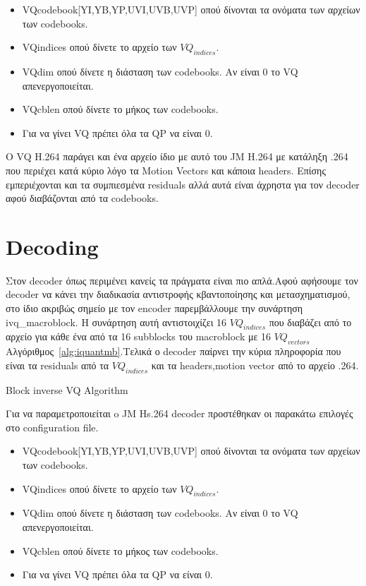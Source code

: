 \begin{itemize}
    \item VQcodebook[YI,YB,YP,UVI,UVB,UVP] οπού δίνονται τα ονόματα των αρχείων των codebooks.
    \item VQindices οπού δίνετε το αρχείο των $VQ_{indices}$.
    \item VQdim οπού δίνετε η διάσταση των codebooks. Αν είναι 0 το VQ απενεργοποιείται.
    \item VQcblen οπού δίνετε το μήκος των codebooks.
    \item Για να γίνει VQ πρέπει όλα τα QP να είναι 0.
\end{itemize}

\indent Ο VQ H.264 παράγει και ένα αρχείο ίδιο με αυτό του JM H.264 με κατάληξη .264 που περιέχει κατά κύριο λόγο τα Motion Vectors και κάποια headers. Επίσης εμπεριέχονται και τα συμπιεσμένα residuals αλλά αυτά είναι άχρηστα για τον decoder αφού διαβάζονται από τα codebooks.

\section{Decoding}
\label{section:sect53}

\indent Στον decoder όπως περιμένει κανείς τα πράγματα είναι πιο απλά.Αφού αφήσουμε τον decoder να κάνει την διαδικασία αντιστροφής κβαντοποίησης και μετασχηματισμού, στο ίδιο ακριβώς σημείο με τον encoder παρεμβάλλουμε την συνάρτηση ivq\_macroblock. Η συνάρτηση αυτή αντιστοιχίζει 16 $VQ_{indices}$ που διαβάζει από το αρχείο για κάθε ένα από τα 16 subblocks του macroblock με 16 $VQ_{vectors}$
Αλγόριθμος~\ref{alg:iquantmb}.Τελικά ο decoder παίρνει την κύρια πληροφορία που είναι τα residuals από τα $VQ_{indices}$ και τα headers,motion vector από το αρχείο .264.

\begin{algorithm}[h]
\begin{algorithmic}[1]
\EndFor
\EndFunction
\end{algorithmic}
\caption{Block inverse VQ Algorithm}
\label{alg:iquantmb}
\end{algorithm}

\indent Για να παραμετροποιείται o JM Ηs.264 decoder προστέθηκαν οι παρακάτω επιλογές στο configuration file.

\begin{itemize}
    \item VQcodebook[YI,YB,YP,UVI,UVB,UVP] οπού δίνονται τα ονόματα των αρχείων των codebooks.
    \item VQindices οπού δίνετε το αρχείο των $VQ_{indices}$.
    \item VQdim οπού δίνετε η διάσταση των codebooks. Αν είναι 0 το VQ απενεργοποιείται.
    \item VQcblen οπού δίνετε το μήκος των codebooks.
    \item Για να γίνει VQ πρέπει όλα τα QP να είναι 0.
\end{itemize} 